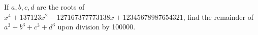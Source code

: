If $a,b,c,d$ are the roots of $x^4+137123x^2-127167377773138x+12345678987654321$, find the remainder of $a^3+b^3+c^3+d^3$ upon division by 100000.

